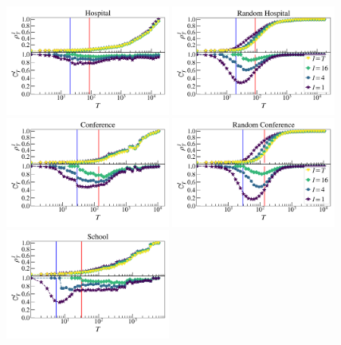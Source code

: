 \documentclass[%
 reprint,
 amsmath,amssymb,
 aps,
]{revtex4-2}
\begin{document}
\begin{figure}[]
\includegraphics[width=0.48\textwidth]{fig/hospital_cr_ana.png}
\includegraphics[width=0.48\textwidth]{fig/hospital_ET_cr_ana_leg.png}
\includegraphics[width=0.48\textwidth]{fig/hypertext_cr_ana.png}
\includegraphics[width=0.48\textwidth]{fig/hypertext_ET_cr_ana_leg.png}
\includegraphics[width=0.48\textwidth]{fig/primaryschool_cr_ana.png}

\end{figure}
\end{document}
